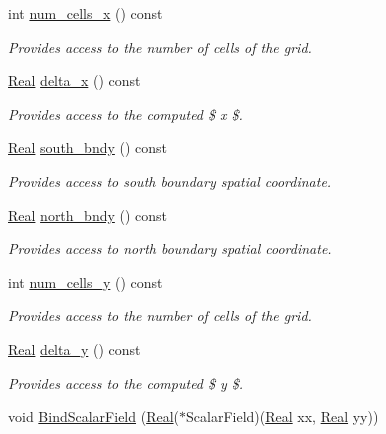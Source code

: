 \begin{DoxyCompactItemize}
int \hyperlink{classmtk_1_1UniStgGrid2D_a2d182866a398aba8e4829590e85bf939}{num\+\_\+cells\+\_\+x} () const 
\begin{DoxyCompactList}\small\item\em Provides access to the number of cells of the grid. \end{DoxyCompactList}\item 
\hyperlink{group__c01-roots_gac080bbbf5cbb5502c9f00405f894857d}{Real} \hyperlink{classmtk_1_1UniStgGrid2D_aca4710004c4a7da6a9e8fd6ab32a691f}{delta\+\_\+x} () const 
\begin{DoxyCompactList}\small\item\em Provides access to the computed \$  x \$. \end{DoxyCompactList}\item 
\hyperlink{group__c01-roots_gac080bbbf5cbb5502c9f00405f894857d}{Real} \hyperlink{classmtk_1_1UniStgGrid2D_a1442eaf219f099d0ebf46a170fdebf92}{south\+\_\+bndy} () const 
\begin{DoxyCompactList}\small\item\em Provides access to south boundary spatial coordinate. \end{DoxyCompactList}\item 
\hyperlink{group__c01-roots_gac080bbbf5cbb5502c9f00405f894857d}{Real} \hyperlink{classmtk_1_1UniStgGrid2D_afe1ead253cdeb5503e0489eba8fd84e2}{north\+\_\+bndy} () const 
\begin{DoxyCompactList}\small\item\em Provides access to north boundary spatial coordinate. \end{DoxyCompactList}\item 
int \hyperlink{classmtk_1_1UniStgGrid2D_aed05a801cc9a76dba0ff203cea58a61a}{num\+\_\+cells\+\_\+y} () const 
\begin{DoxyCompactList}\small\item\em Provides access to the number of cells of the grid. \end{DoxyCompactList}\item 
\hyperlink{group__c01-roots_gac080bbbf5cbb5502c9f00405f894857d}{Real} \hyperlink{classmtk_1_1UniStgGrid2D_a65a78cfc80ffdbeb282ed57af4dc5cb4}{delta\+\_\+y} () const 
\begin{DoxyCompactList}\small\item\em Provides access to the computed \$  y \$. \end{DoxyCompactList}\item 
void \hyperlink{classmtk_1_1UniStgGrid2D_ab6aff36e9f89fba1c1ff4f9914508211}{Bind\+Scalar\+Field} (\hyperlink{group__c01-roots_gac080bbbf5cbb5502c9f00405f894857d}{Real}($\ast$Scalar\+Field)(\hyperlink{group__c01-roots_gac080bbbf5cbb5502c9f00405f894857d}{Real} xx, \hyperlink{group__c01-roots_gac080bbbf5cbb5502c9f00405f894857d}{Real} yy))

\end{DoxyCompactItemize}
